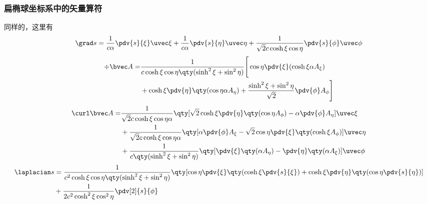 \subsubsection{扁椭球坐标系中的矢量算符}
同样的，这里有
\begin{equation}
\grad s = \frac{1}{c\alpha} \pdv{s}{\xi}\uvec \xi + \frac{1}{c\alpha}\pdv{s}{\eta} \uvec \eta +  \frac{1}{\sqrt{2}c\cosh\xi\cos\eta}\pdv{s}{\phi}\uvec \phi
\end{equation}
\begin{equation}
\begin{aligned}
\div \bvec A = &\frac{1}{c\cosh\xi\cos\eta\qty(\sinh^2\xi+\sin^2\eta)}\Bigg[\cos\eta\pdv{\xi}(\cosh\xi\alpha A_\xi) \\&+ \cosh\xi\pdv{\eta}\qty(\cos\eta\alpha A_\eta) + \frac{\sinh^2\xi+\sin^2\eta}{\sqrt{2}}\pdv{\phi}A_\phi\Bigg]
\end{aligned}
\end{equation}
\begin{equation}
\begin{aligned}
\curl \bvec A =& \frac{1}{\sqrt{2}c\cosh\xi\cos\eta\alpha}\qty[\sqrt{2}\cosh\xi\pdv{\eta}\qty(\cos\eta
A_\phi) - \alpha\pdv{\phi}A_\eta]\uvec \xi\\
&+ \frac{1}{\sqrt{2}c\cosh\xi\cos\eta\alpha}\qty[\alpha\pdv{\phi}A_\xi - \sqrt{2}\cos\eta\pdv{\xi}\qty(\cosh\xi
A_\phi)]\uvec \eta
 \\
&+\frac{1}{c\qty(\sinh^2\xi+\sin^2\eta)}\qty[\pdv{\xi}\qty(\alpha A_\eta) - \pdv{\eta}\qty(\alpha A_\xi)]\uvec \phi
\end{aligned}
\end{equation}
\begin{equation}
\begin{aligned}
\laplacian s &= \frac{1}{c^2\cosh\xi\cos\eta\qty(\sinh^2\xi+\sin^2\eta)}\qty[\cos\eta\pdv{\xi}\qty(\cosh\xi\pdv{s}{\xi}) + \cosh\xi\pdv{\eta}\qty(\cos\eta\pdv{s}{\eta})]\\
&+ \frac{1}{2c^2\cosh^2\xi\cos^2\eta }\pdv[2]{s}{\phi}
\end{aligned}
\end{equation}

